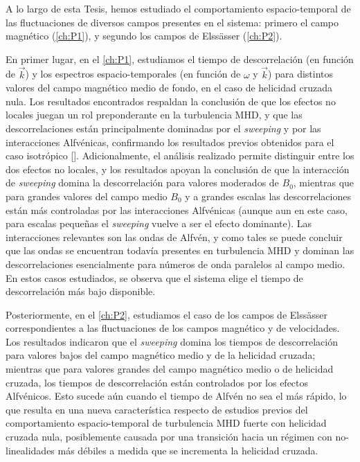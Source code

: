 A lo largo de esta Tesis, hemos estudiado el comportamiento
espacio-temporal de las fluctuaciones de diversos campos presentes en
el sistema: primero el campo magnético (\cref{ch:P1}), y segundo los
campos de Elss\"asser (\cref{ch:P2}).

En primer lugar, en el \cref{ch:P1}, estudiamos el tiempo de
descorrelación (en función de $\vec{k}$) y los espectros
espacio-temporales (en función de $\omega$ y $\vec{k}$) para distintos
valores del campo magnético medio de fondo, en el caso de helicidad
cruzada nula. Los resultados encontrados respaldan la conclusión de
que los efectos no locales juegan un rol preponderante en la
turbulencia MHD, y que las descorrelaciones están principalmente
dominadas por el \textit{sweeping} y por las interacciones Alfvénicas,
confirmando los resultados previos obtenidos para el caso isotrópico
[\cite{servidio_time_2011}]. Adicionalmente, el análisis realizado
permite distinguir entre los dos efectos no locales, y los resultados
apoyan la conclusión de que la interacción de \textit{sweeping} domina
la descorrelación para valores moderados de $B_0$, mientras que para
grandes valores del campo medio $B_0$ y a grandes escalas las
descorrelaciones están más controladas por las interacciones
Alfvénicas (aunque aun en este caso, para escalas pequeñas
el \textit{sweeping} vuelve a ser el efecto dominante). Las
interacciones relevantes son las ondas de Alfvén, y como tales se
puede concluir que las ondas se encuentran todavía presentes en
turbulencia MHD y dominan las descorrelaciones esencialmente para
números de onda paralelos al campo medio. En estos casos estudiados,
se observa que el sistema elige el tiempo de descorrelación más bajo
disponible.

Posteriormente, en el \cref{ch:P2}, estudiamos el caso de los campos
de Elss\"asser correspondientes a las fluctuaciones de los campos
magnético y de velocidades. Los resultados indicaron que
el \textit{sweeping} domina los tiempos de descorrelación para valores
bajos del campo magnético medio y de la helicidad cruzada; mientras que
para valores grandes del campo magnético medio o de helicidad
cruzada, los tiempos de descorrelación están controlados por los
efectos Alfvénicos. Esto sucede aún cuando el tiempo de Alfvén no sea
el más rápido, lo que resulta en una nueva característica respecto de
estudios previos del comportamiento espacio-temporal de turbulencia
MHD fuerte con helicidad cruzada nula, posiblemente causada por una
transición hacia un régimen con no-linealidades más débiles a medida
que se incrementa la helicidad cruzada.

